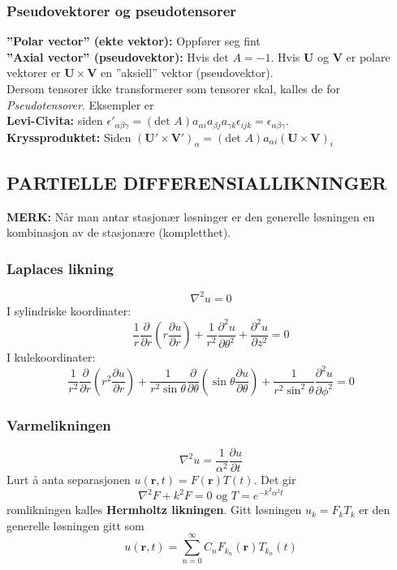 \documentclass[a4paper, norsk, 8pt]{article}
\newcommand{\PAR}[2]{ \frac{\partial #1}{\partial #2}}
\begin{document}
\begin{multicols*}{2}
\subsubsection*{\small Pseudovektorer og pseudotensorer}
\textbf{''Polar vector'' (ekte vektor):} Oppfører seg fint \\
\textbf{''Axial vector'' (pseudovektor):} Hvis $\mbox{det }A=-1$. Hvis $\mathbf{U}$ og $\mathbf{V}$ er polare vektorer er $\mathbf{U}\times \mathbf{V}$ en ''aksiell'' vektor (pseudovektor). \\
Dersom tensorer ikke transformerer som tensorer skal, kalles de for \textit{Pseudotensorer}. Eksempler er\\
\textbf{Levi-Civita:} siden $\epsilon'_{\alpha \beta \gamma}=(\mbox{det } A) a_{\alpha i} a_{\beta j} a_{\gamma k} \epsilon_{ijk}=\epsilon_{\alpha \beta \gamma}$.  \\
\textbf{Kryssproduktet:} Siden $(\mathbf{U}'\times \mathbf{V}')_\alpha=(\mbox{det } A)a_{\alpha i}(\mathbf{U}\times \mathbf{V})_i$\\


\subsection*{\footnotesize PARTIELLE DIFFERENSIALLIKNINGER }
\textbf{MERK:} Når man antar stasjonær løsninger er den generelle løsningen en kombinasjon av de stasjonære (kompletthet).

\subsubsection*{\small Laplaces likning}
\[
\nabla^2 u = 0
\]
I sylindriske koordinater:
\[
\frac{1}{r}\PAR{}{r}\left(r\PAR{u}{r}\right)+\frac{1}{r^2}\PAR{^2 u}{\theta^2}+\PAR{^2 u}{z^2}=0
\]
I kulekoordinater:
\[
\frac{1}{r^2}\PAR{}{r}\left(r^2\PAR{u}{r}\right)+\frac{1}{r^2 \sin \theta} \PAR{}{\theta}\left(\sin \theta \PAR{u}{\theta} \right)+\frac{1}{r^2 \sin^2 \theta}\PAR{^2u}{\phi^2}=0
\]

\subsubsection*{\small Varmelikningen}
\[
\nabla^2 u = \frac{1}{\alpha^2}\PAR{u}{t}
\]
Lurt å anta separasjonen $u(\mathbf{r},t)=F(\mathbf{r})T(t)$. Det gir 
\[
\nabla^2 F + k^2 F=0 \mbox{ og } T = e^{-k^2 \alpha^2 t}
\]
romlikningen kalles \textbf{Hermholtz likningen}. Gitt løsningen $u_k = F_k T_k$ er den generelle løsningen gitt som 
\[
u(\mathbf{r},t)=\sum_{n=0}^\infty C_n F_{k_n}(\mathbf{r})  T_{k_n}(t)
\]


\end{multicols*}
\end{document}
